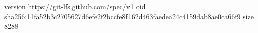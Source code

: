version https://git-lfs.github.com/spec/v1
oid sha256:11fa52b3c2705627d6efe2f2bccfe8f162d463faedea24c4159dab8ae0ca66f9
size 8288
